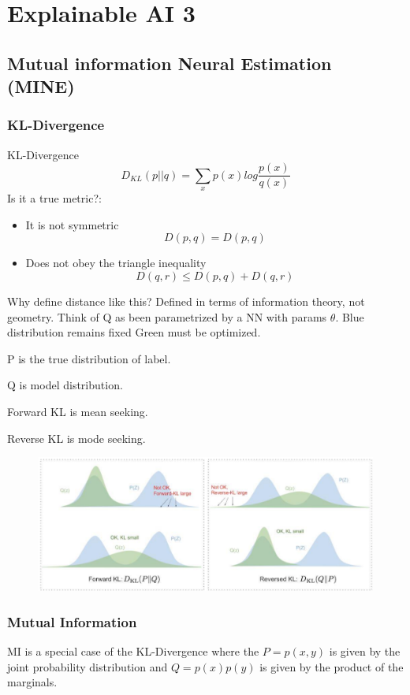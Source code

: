 \section{Explainable AI 3}
\subsection{Mutual information Neural Estimation (MINE)}
\subsubsection{KL-Divergence}
KL-Divergence
\[
D_{KL}(p||q) = \sum_{x} p(x) log \frac{p(x)}{q(x)}
\]
Is it a true metric?:
\begin{itemize}
    \item It is not symmetric\[
    D(p,q)  = D(p,q)
    \]
    \item Does not obey the triangle inequality\[
    D(q,r) \le D(p,q) + D(q,r)
    \]
\end{itemize}
Why define distance like this?
Defined in terms of information theory, not geometry.
Think of Q as been parametrized by a NN with params \(\theta\).
Blue distribution remains fixed Green must be optimized.

P is the true distribution of label.

Q is model distribution.

Forward KL is mean seeking.

Reverse KL is mode seeking.
\begin{figure}
\includegraphics[width = \columnwidth]{figures/XAI3/KL.png}
\end{figure}

\subsubsection{Mutual Information}

MI is a special case of the KL-Divergence where the \(P=p(x,y)\) is given by the joint probability distribution and \(Q = p(x)p(y)\) is given by the product of the marginals.

